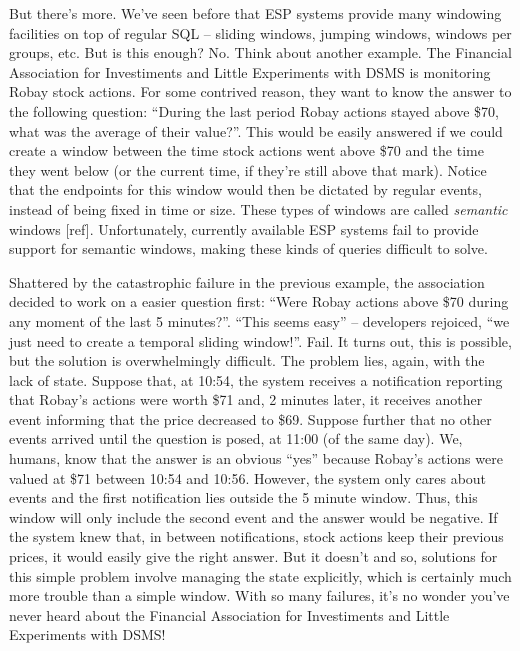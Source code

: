 \documentclass{report}
\begin{document}
But there's more. We've seen before that ESP systems provide many windowing facilities on top of regular SQL -- sliding windows, jumping windows, windows per groups, etc. But is this enough? No. Think about another example. The Financial Association for Investiments and Little Experiments with DSMS is monitoring Robay stock actions. For some contrived reason, they want to know the answer to the following question: ``During the last period Robay actions stayed above \$70, what was the average of their value?''. This would be easily answered if we could create a window between the time stock actions went above \$70 and the time they went below (or the current time, if they're still above that mark). Notice that the endpoints for this window would then be dictated by regular events, instead of being fixed in time or size. These types of windows are called \emph{semantic} windows [ref]. Unfortunately, currently available ESP systems fail to provide support for semantic windows, making these kinds of queries difficult to solve.

Shattered by the catastrophic failure in the previous example, the association decided to work on a easier question first: ``Were Robay actions above \$70 during any moment of the last 5 minutes?''. ``This seems easy'' -- developers rejoiced, ``we just need to create a temporal sliding window!''. Fail. It turns out, this is possible, but the solution is overwhelmingly difficult. The problem lies, again, with the lack of state. Suppose that, at 10:54, the system receives a notification reporting that Robay's actions were worth \$71 and, 2 minutes later, it receives another event informing that the price decreased to \$69. Suppose further that no other events arrived until the question is posed, at 11:00 (of the same day). We, humans, know that the answer is an obvious ``yes'' because Robay's actions were valued at \$71 between 10:54 and 10:56. However, the system only cares about events and the first notification lies outside the 5 minute window. Thus, this window will only include the second event and the answer would be negative. If the system knew that, in between notifications, stock actions keep their previous prices, it would easily give the right answer. But it doesn't and so, solutions for this simple problem involve managing the state explicitly, which is certainly much more trouble than a simple window. With so many failures, it's no wonder you've never heard about the Financial Association for Investiments and Little Experiments with DSMS!
\end{document}

